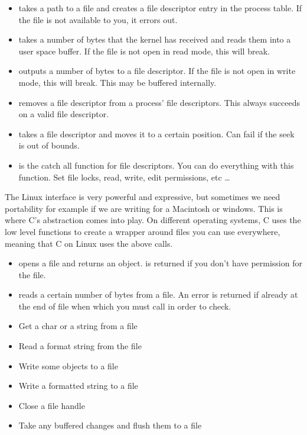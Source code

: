  \begin{itemize}
\item {} takes a path to a file and creates a file descriptor entry in the process table. If the file is not available to you, it errors out.
\item {} takes a number of bytes that the kernel has received and reads them into a user space buffer. If the file is not open in read mode, this will break.
\item {} outputs a number of bytes to a file descriptor. If the file is not open in write mode, this will break. This may be buffered internally.
\item {} removes a file descriptor from a process' file descriptors. This always succeeds on a valid file descriptor.
\item {} takes a file descriptor and moves it to a certain position. Can fail if the seek is out of bounds.
\item {} is the catch all function for file descriptors. You can do everything with this function. Set file locks, read, write, edit permissions, etc \ldots{}
 \end{itemize}

The Linux interface is very powerful and expressive, but sometimes we need portability for example if we are writing for a Macintosh or windows.
This is where C's abstraction comes into play.
On different operating systems, C uses the low level functions to create a wrapper around files you can use everywhere, meaning that C on Linux uses the above calls.

\begin{itemize}
\item {} opens a file and returns an object.  is returned if you don't have permission for the file.
\item {} reads a certain number of bytes from a file. An error is returned if already at the end of file when which you must call  in order to check.
\item {} Get a char or a string from a file
\item {} Read a format string from the file
\item {} Write some objects to a file
\item {} Write a formatted string to a file
\item {} Close a file handle
\item {} Take any buffered changes and flush them to a file
\end{itemize}

